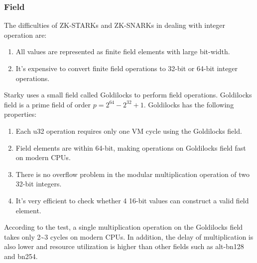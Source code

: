 \subsubsection{Field}\label{section: starky-field}

\noindent The difficulties of ZK-STARKs and ZK-SNARKs in dealing with integer operation are:

\begin{enumerate}
    \item All values are represented as finite field elements with large bit-width.
    \item It's expensive to convert finite field operations to 32-bit or 64-bit integer operations.
\end{enumerate}

\noindent Starky uses a small field called Goldilocks to perform field operations. Goldilocks field is a prime field of order $p = 2^{64} - 2^{32} + 1$. Goldilocks has the following properties:

\begin{enumerate}
    \item Each u32 operation requires only one VM cycle using the Goldilocks field.
    \item Field elements are within 64-bit, making operations on Goldilocks field fast on modern CPUs.
    \item There is no overflow problem in the modular multiplication operation of two 32-bit integers.
    \item It's very efficient to check whether 4 16-bit values can construct a valid field element.
\end{enumerate}

According to the test, a single multiplication operation on the Goldilocks field takes only 2\textasciitilde3 cycles on modern CPUs. In addition, the delay of multiplication is also lower and resource utilization is higher than other fields such as alt-bn128 and bn254.